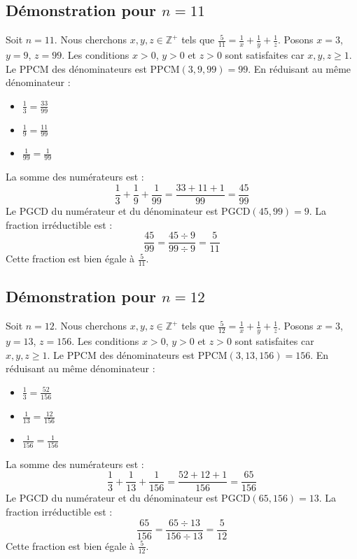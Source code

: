\documentclass[11pt,a4paper]{article}
\begin{document}
\subsection{Démonstration pour $n = 11$}
Soit $n = 11$. Nous cherchons $x, y, z \in \mathbb{Z}^{+}$ tels que $\frac{5}{11} = \frac{1}{x} + \frac{1}{y} + \frac{1}{z}$.
Posons $x = 3$, $y = 9$, $z = 99$.
Les conditions $x > 0$, $y > 0$ et $z > 0$ sont satisfaites car $x, y, z \geq 1$.
Le PPCM des dénominateurs est $\text{PPCM}(3, 9, 99) = 99$.
En réduisant au même dénominateur :
\begin{itemize}
    \item $\frac{1}{3} = \frac{33}{99}$
    \item $\frac{1}{9} = \frac{11}{99}$
    \item $\frac{1}{99} = \frac{1}{99}$
\end{itemize}
La somme des numérateurs est :
$$ \frac{1}{3} + \frac{1}{9} + \frac{1}{99} = \frac{33 + 11 + 1}{99} = \frac{45}{99} $$
Le PGCD du numérateur et du dénominateur est $\text{PGCD}(45, 99) = 9$.
La fraction irréductible est :
$$ \frac{45}{99} = \frac{45 \div 9}{99 \div 9} = \frac{5}{11} $$
Cette fraction est bien égale à $\frac{5}{11}$.

\subsection{Démonstration pour $n = 12$}
Soit $n = 12$. Nous cherchons $x, y, z \in \mathbb{Z}^{+}$ tels que $\frac{5}{12} = \frac{1}{x} + \frac{1}{y} + \frac{1}{z}$.
Posons $x = 3$, $y = 13$, $z = 156$.
Les conditions $x > 0$, $y > 0$ et $z > 0$ sont satisfaites car $x, y, z \geq 1$.
Le PPCM des dénominateurs est $\text{PPCM}(3, 13, 156) = 156$.
En réduisant au même dénominateur :
\begin{itemize}
    \item $\frac{1}{3} = \frac{52}{156}$
    \item $\frac{1}{13} = \frac{12}{156}$
    \item $\frac{1}{156} = \frac{1}{156}$
\end{itemize}
La somme des numérateurs est :
$$ \frac{1}{3} + \frac{1}{13} + \frac{1}{156} = \frac{52 + 12 + 1}{156} = \frac{65}{156} $$
Le PGCD du numérateur et du dénominateur est $\text{PGCD}(65, 156) = 13$.
La fraction irréductible est :
$$ \frac{65}{156} = \frac{65 \div 13}{156 \div 13} = \frac{5}{12} $$
Cette fraction est bien égale à $\frac{5}{12}$.
\end{document}
